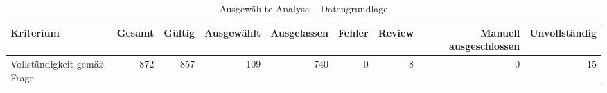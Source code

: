 \begin{table}[htbp]
\centering
\caption{Ausgewählte Analyse -- Datengrundlage}
\begin{tabular}{lrrrrrrrr}
\toprule
Kriterium & Gesamt & Gültig & Ausgewählt & Ausgelassen & Fehler & Review & Manuell ausgeschlossen & Unvollständig \\
\midrule
Vollständigkeit gemäß Frage & 872 & 857 & 109 & 740 & 0 & 8 & 0 & 15 \\
\bottomrule
\end{tabular}
\end{table}

